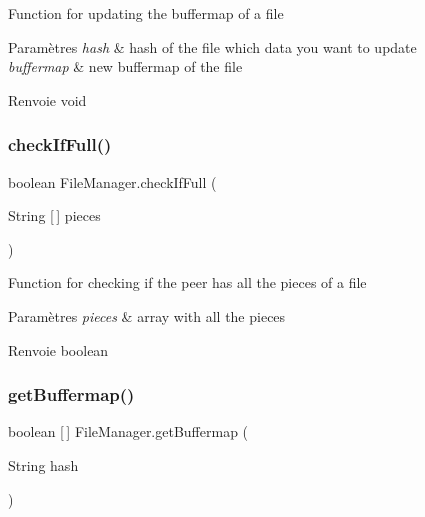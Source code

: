Function for updating the buffermap of a file


\begin{DoxyParams}{Paramètres}
{\em hash} & hash of the file which data you want to update \\
\hline
{\em buffermap} & new buffermap of the file \\
\hline
\end{DoxyParams}
\begin{DoxyReturn}{Renvoie}
void 
\end{DoxyReturn}
\mbox{\label{classFileManager_a5ae706d01456c0b37a47a5ff84a9fa15}} 
\subsubsection{\texorpdfstring{check\+If\+Full()}{checkIfFull()}}
{\footnotesize\ttfamily boolean File\+Manager.\+check\+If\+Full (\begin{DoxyParamCaption}\item[{String \mbox{[}$\,$\mbox{]}}]{pieces }\end{DoxyParamCaption})\hspace{0.3cm}{\ttfamily [inline]}}

Function for checking if the peer has all the pieces of a file


\begin{DoxyParams}{Paramètres}
{\em pieces} & array with all the pieces \\
\hline
\end{DoxyParams}
\begin{DoxyReturn}{Renvoie}
boolean 
\end{DoxyReturn}
\mbox{\label{classFileManager_a6f00a2b4ff073d49229b469f3971445d}} 
\subsubsection{\texorpdfstring{get\+Buffermap()}{getBuffermap()}}
{\footnotesize\ttfamily boolean \mbox{[}$\,$\mbox{]} File\+Manager.\+get\+Buffermap (\begin{DoxyParamCaption}\item[{String}]{hash }\end{DoxyParamCaption})\hspace{0.3cm}{\ttfamily [inline]}}

